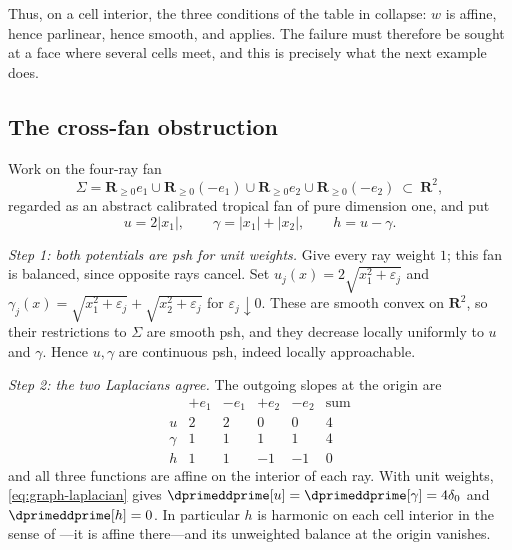 Thus, on a cell interior, the three conditions of the table in
 collapse: $w$ is affine, hence parlinear, hence
smooth, and  applies.  The failure must therefore be
sought at a face where several cells meet, and this is precisely what the
next example does.

\subsection{The cross-fan obstruction}
\label{sec:ch16-cross-fan}

\begin{example}
\label{ex:ch16-cross-fan}
Work on the four-ray fan
\begin{equation}
\label{eq:ch16-cross-fan}
 \Sigma=\mathbf R_{\geq0}e_1\cup\mathbf R_{\geq0}(-e_1)
   \cup\mathbf R_{\geq0}e_2\cup\mathbf R_{\geq0}(-e_2)
   \ \subset\ \mathbf R^2,
\end{equation}
regarded as an abstract calibrated tropical fan of pure dimension one, and
put
\begin{equation}
\label{eq:ch16-cross-functions}
 u=2|x_1|,\qquad \gamma=|x_1|+|x_2|,\qquad h=u-\gamma .
\end{equation}

\emph{Step 1: both potentials are psh for unit weights.}  Give every ray
weight $1$; this fan is balanced, since opposite rays cancel.  Set
$u_j(x)=2\sqrt{x_1^2+\varepsilon_j}$ and
$\gamma_j(x)=\sqrt{x_1^2+\varepsilon_j}+\sqrt{x_2^2+\varepsilon_j}$ for
$\varepsilon_j\downarrow0$.  These are smooth convex on $\mathbf R^2$, so
their restrictions to $\Sigma$ are smooth psh, and they decrease locally
uniformly to $u$ and $\gamma$.  Hence $u,\gamma$ are continuous psh, indeed
locally approachable.

\emph{Step 2: the two Laplacians agree.}  The outgoing slopes at the origin
are
\begin{equation}
\label{eq:ch16-cross-slopes}
\begin{array}{c|cccc|c}
 &+e_1&-e_1&+e_2&-e_2&\text{sum}\\ \hline
u&2&2&0&0&4\\
\gamma&1&1&1&1&4\\
h&1&1&-1&-1&0
\end{array}
\end{equation}
and all three functions are affine on the interior of each ray.  With unit
weights, \eqref{eq:graph-laplacian} gives
$\dprimeddprime[u]=\dprimeddprime[\gamma]=4\delta_0$ and
$\dprimeddprime[h]=0$.  In particular $h$ is harmonic on each cell interior
in the sense of ---it is affine there---and its
unweighted balance at the origin vanishes.


\end{example}
